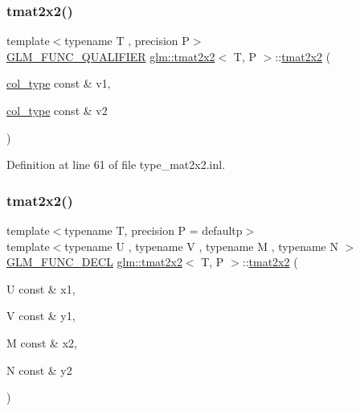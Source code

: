 \mbox{\label{structglm_1_1tmat2x2_a6b69a58d1a8d7856f47240557f0c8615}} 
\subsubsection{\texorpdfstring{tmat2x2()}{tmat2x2()}\hspace{0.1cm}{\footnotesize\ttfamily [7/22]}}
{\footnotesize\ttfamily template$<$typename T , precision P$>$ \\
\mbox{\hyperlink{setup_8hpp_a33fdea6f91c5f834105f7415e2a64407}{G\+L\+M\+\_\+\+F\+U\+N\+C\+\_\+\+Q\+U\+A\+L\+I\+F\+I\+ER}} \mbox{\hyperlink{structglm_1_1tmat2x2}{glm\+::tmat2x2}}$<$ T, P $>$\+::\mbox{\hyperlink{structglm_1_1tmat2x2}{tmat2x2}} (\begin{DoxyParamCaption}\item[{\mbox{\hyperlink{structglm_1_1tmat2x2_a9e4690f52926b475b36ed5f6209f22f4}{col\+\_\+type}} const \&}]{v1,  }\item[{\mbox{\hyperlink{structglm_1_1tmat2x2_a9e4690f52926b475b36ed5f6209f22f4}{col\+\_\+type}} const \&}]{v2 }\end{DoxyParamCaption})}



Definition at line 61 of file type\+\_\+mat2x2.\+inl.

\mbox{\label{structglm_1_1tmat2x2_aac710faffcebf55cc2120a98b4ab0373}} 
\subsubsection{\texorpdfstring{tmat2x2()}{tmat2x2()}\hspace{0.1cm}{\footnotesize\ttfamily [8/22]}}
{\footnotesize\ttfamily template$<$typename T, precision P = defaultp$>$ \\
template$<$typename U , typename V , typename M , typename N $>$ \\
\mbox{\hyperlink{setup_8hpp_ab2d052de21a70539923e9bcbf6e83a51}{G\+L\+M\+\_\+\+F\+U\+N\+C\+\_\+\+D\+E\+CL}} \mbox{\hyperlink{structglm_1_1tmat2x2}{glm\+::tmat2x2}}$<$ T, P $>$\+::\mbox{\hyperlink{structglm_1_1tmat2x2}{tmat2x2}} (\begin{DoxyParamCaption}\item[{U const \&}]{x1,  }\item[{V const \&}]{y1,  }\item[{M const \&}]{x2,  }\item[{N const \&}]{y2 }\end{DoxyParamCaption})}

